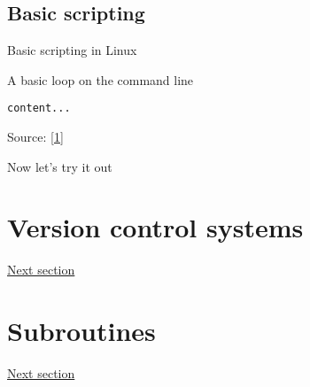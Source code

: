 \documentclass[xcolor=table,compress]{beamer}
\begin{document}
\subsection{Basic scripting}
\begin{frame}[fragile]{Basic scripting in Linux}
\begin{block}{A basic loop on the command line}
\begin{verbatim}
content...
\end{verbatim}

\end{block}
\end{frame}


\begin{frame}
\tiny{Source: \href{http://www.cyberciti.biz/faq/bash-for-loop/}{[1]}}
\end{frame}
\begin{frame}
Now let's try it out
\end{frame}

\section[VCS]{Version control systems}
\begin{frame}
\href{day1-2.pdf}{Next section}
\end{frame}

\section{Subroutines}
\begin{frame}
\href{day1-3.pdf}{Next section}
\end{frame}
\end{document}
